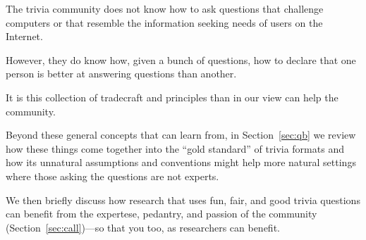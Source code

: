 The trivia community does not know how to ask questions that challenge computers or that resemble the information seeking needs of users on the Internet.

However, they do know how, given a bunch of questions, how to declare that one person is better at answering questions than another.

It is this collection of tradecraft and principles than in our view can help the  community.

Beyond these general concepts that  can learn from, in
Section~\ref{sec:qb} we review how these things come together into the ``gold standard'' of trivia formats and how its unnatural assumptions and conventions might help more natural  settings where those asking the questions are not experts.

We then briefly discuss how research that uses fun, fair, and good
trivia questions can benefit from the expertese, pedantry, and passion
of the community (Section~\ref{sec:call})---so that you too, as
researchers can benefit.